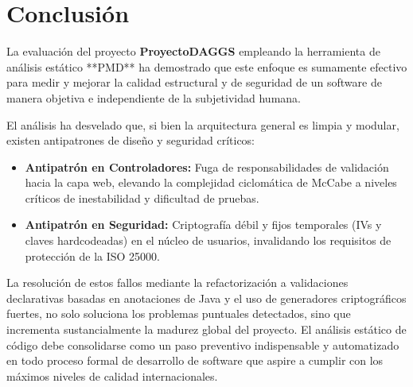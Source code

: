 \documentclass[12pt,a4paper]{article}
\begin{document}
\section{Conclusión}
La evaluación del proyecto \textbf{ProyectoDAGGS} empleando la herramienta de análisis estático **PMD** ha demostrado que este enfoque es sumamente efectivo para medir y mejorar la calidad estructural y de seguridad de un software de manera objetiva e independiente de la subjetividad humana.

El análisis ha desvelado que, si bien la arquitectura general es limpia y modular, existen antipatrones de diseño y seguridad críticos:
\begin{itemize}
    \item \textbf{Antipatrón en Controladores:} Fuga de responsabilidades de validación hacia la capa web, elevando la complejidad ciclomática de McCabe a niveles críticos de inestabilidad y dificultad de pruebas.
    \item \textbf{Antipatrón en Seguridad:} Criptografía débil y fijos temporales (IVs y claves hardcodeadas) en el núcleo de usuarios, invalidando los requisitos de protección de la ISO 25000.
\end{itemize}

La resolución de estos fallos mediante la refactorización a validaciones declarativas basadas en anotaciones de Java y el uso de generadores criptográficos fuertes, no solo soluciona los problemas puntuales detectados, sino que incrementa sustancialmente la madurez global del proyecto. El análisis estático de código debe consolidarse como un paso preventivo indispensable y automatizado en todo proceso formal de desarrollo de software que aspire a cumplir con los máximos niveles de calidad internacionales.
\end{document}
